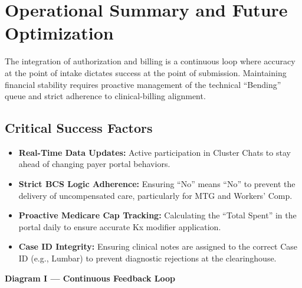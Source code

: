 \documentclass[11pt,a4paper]{article}
\begin{document}
\section{Operational Summary and Future Optimization}

The integration of authorization and billing is a continuous loop where accuracy at the point of intake dictates success at the point of submission. Maintaining financial stability requires proactive management of the technical ``Bending'' queue and strict adherence to clinical-billing alignment.

\subsection{Critical Success Factors}

\begin{itemize}
  \item \textbf{Real-Time Data Updates:} Active participation in Cluster Chats to stay ahead of changing payer portal behaviors.
  \item \textbf{Strict BCS Logic Adherence:} Ensuring ``No'' means ``No'' to prevent the delivery of uncompensated care, particularly for MTG and Workers' Comp.
  \item \textbf{Proactive Medicare Cap Tracking:} Calculating the ``Total Spent'' in the portal daily to ensure accurate Kx modifier application.
  \item \textbf{Case ID Integrity:} Ensuring clinical notes are assigned to the correct Case ID (e.g., Lumbar) to prevent diagnostic rejections at the clearinghouse.
\end{itemize}

\vspace{0.4em}
\begin{center}
\textbf{\color{AccentTeal}Diagram I --- Continuous Feedback Loop}\\[0.5em]
\end{center}
\end{document}

